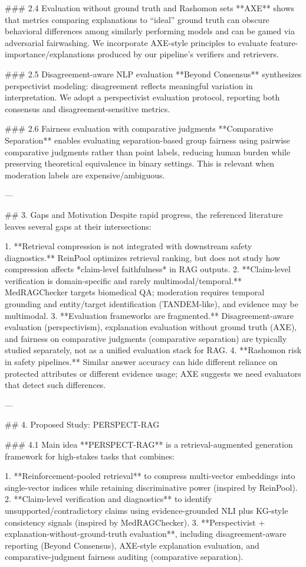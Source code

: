 ### 2.4 Evaluation without ground truth and Rashomon sets  
**AXE** shows that metrics comparing explanations to “ideal” ground truth can obscure behavioral differences among similarly performing models and can be gamed via adversarial fairwashing. We incorporate AXE-style principles to evaluate feature-importance/explanations produced by our pipeline’s verifiers and retrievers.

### 2.5 Disagreement-aware NLP evaluation  
**Beyond Consensus** synthesizes perspectivist modeling: disagreement reflects meaningful variation in interpretation. We adopt a perspectivist evaluation protocol, reporting both consensus and disagreement-sensitive metrics.

### 2.6 Fairness evaluation with comparative judgments  
**Comparative Separation** enables evaluating separation-based group fairness using pairwise comparative judgments rather than point labels, reducing human burden while preserving theoretical equivalence in binary settings. This is relevant when moderation labels are expensive/ambiguous.

---

## 3. Gaps and Motivation  
Despite rapid progress, the referenced literature leaves several gaps at their intersections:

1. **Retrieval compression is not integrated with downstream safety diagnostics.** ReinPool optimizes retrieval ranking, but does not study how compression affects *claim-level faithfulness* in RAG outputs.  
2. **Claim-level verification is domain-specific and rarely multimodal/temporal.** MedRAGChecker targets biomedical QA; moderation requires temporal grounding and entity/target identification (TANDEM-like), and evidence may be multimodal.  
3. **Evaluation frameworks are fragmented.** Disagreement-aware evaluation (perspectivism), explanation evaluation without ground truth (AXE), and fairness on comparative judgments (comparative separation) are typically studied separately, not as a unified evaluation stack for RAG.  
4. **Rashomon risk in safety pipelines.** Similar answer accuracy can hide different reliance on protected attributes or different evidence usage; AXE suggests we need evaluators that detect such differences.

---

## 4. Proposed Study: PERSPECT-RAG  

### 4.1 Main idea  
**PERSPECT-RAG** is a retrieval-augmented generation framework for high-stakes tasks that combines:

1. **Reinforcement-pooled retrieval** to compress multi-vector embeddings into single-vector indices while retaining discriminative power (inspired by ReinPool).  
2. **Claim-level verification and diagnostics** to identify unsupported/contradictory claims using evidence-grounded NLI plus KG-style consistency signals (inspired by MedRAGChecker).  
3. **Perspectivist + explanation-without-ground-truth evaluation**, including disagreement-aware reporting (Beyond Consensus), AXE-style explanation evaluation, and comparative-judgment fairness auditing (comparative separation).

